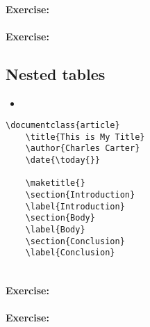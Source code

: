         \paragraph{Exercise:}

        \paragraph{Exercise:}


        \subsection{Nested tables}
        \label{Nested tables}
        
        \begin{framed}
            \begin{itemize}
                \item{}
            \end{itemize}
        \end{framed}


        \begin{verbatim}
\documentclass{article}
    \title{This is My Title}
    \author{Charles Carter}
    \date{\today{}}
 
    \maketitle{}
    \section{Introduction}
    \label{Introduction}
    \section{Body}
    \label{Body}
    \section{Conclusion}
    \label{Conclusion}
    
        \end{verbatim}

        \paragraph{Exercise:}

        \paragraph{Exercise:}


